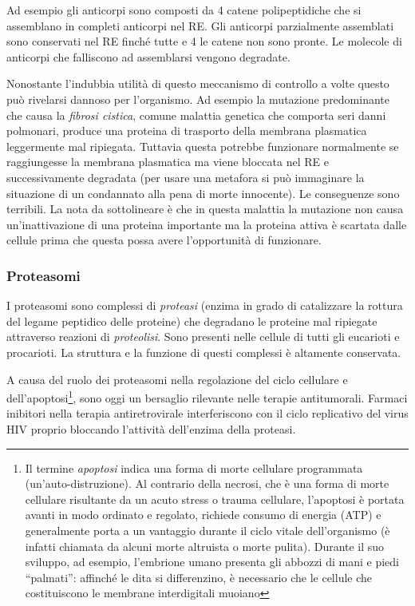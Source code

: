 {{\par Ad esempio gli anticorpi sono composti da 4 catene polipeptidiche che si assemblano in completi anticorpi nel RE. Gli anticorpi parzialmente assemblati sono conservati nel RE finché tutte e 4 le catene non sono pronte. Le molecole di anticorpi che falliscono ad assemblarsi vengono degradate.


\par Nonostante l'indubbia utilità di questo meccanismo di controllo a volte questo può rivelarsi dannoso per l'organismo. Ad esempio la mutazione predominante che causa la \textit{fibrosi cistica}, comune malattia genetica che comporta seri danni polmonari, produce una proteina di trasporto della membrana plasmatica leggermente mal ripiegata. Tuttavia questa potrebbe funzionare normalmente se raggiungesse la membrana plasmatica ma viene bloccata nel RE e successivamente degradata\supercite{alberts2018essential} (per usare una metafora si può immaginare la situazione di un condannato alla pena di morte innocente). Le conseguenze sono terribili. La nota da sottolineare è che in questa malattia la mutazione non causa un'inattivazione di una proteina importante ma la proteina attiva è scartata dalle cellule prima che questa possa avere l'opportunità di funzionare. \\

\subsubsection{Proteasomi}
\par I proteasomi sono complessi di \textit{proteasi} (enzima in grado di catalizzare la rottura del legame peptidico delle proteine) che degradano le proteine mal ripiegate attraverso reazioni di \textit{proteolisi}. Sono presenti nelle cellule di tutti gli eucarioti e procarioti. La struttura e la funzione di questi complessi è altamente conservata.

\par A causa del ruolo dei proteasomi nella regolazione del ciclo cellulare e dell'apoptosi\footnote{Il termine \textit{apoptosi} indica una forma di morte cellulare programmata (un'auto-distruzione). Al contrario della necrosi, che è una forma di morte cellulare risultante da un acuto stress o trauma cellulare, l'apoptosi è portata avanti in modo ordinato e regolato, richiede consumo di energia (ATP) e generalmente porta a un vantaggio durante il ciclo vitale dell'organismo (è infatti chiamata da alcuni morte altruista o morte pulita). Durante il suo sviluppo, ad esempio, l'embrione umano presenta gli abbozzi di mani e piedi “palmati”: affinché le dita si differenzino, è necessario che le cellule che costituiscono le membrane interdigitali muoiano}, sono oggi un bersaglio rilevante nelle terapie antitumorali. Farmaci inibitori nella terapia antiretrovirale interferiscono con il ciclo replicativo del virus HIV proprio bloccando l'attività dell'enzima della proteasi.

}}
